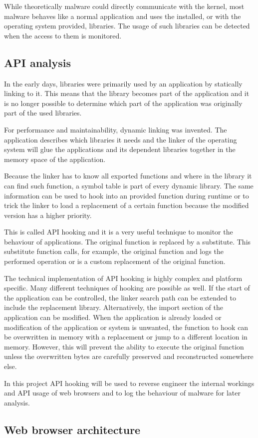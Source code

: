 While theoretically malware could directly communicate with the kernel, most malware behaves like a normal application and uses the installed, or with the operating system provided, libraries. The usage of such libraries can be detected when the access to them is monitored.

\subsection{API analysis}

In the early days, libraries were primarily used by an application by statically linking to it. This means that the library becomes part of the application and it is no longer possible to determine which part of the application was originally part of the used libraries.

For performance and maintainability, dynamic linking was invented. The application describes which libraries it needs and the linker of the operating system will glue the applications and its dependent libraries together in the memory space of the application. 

Because the linker has to know all exported functions and where in the library it can find such function, a symbol table is part of every dynamic library. The same information can be used to hook into an provided function during runtime or to trick the linker to load a replacement of a certain function because the modified version has a higher priority.

This is called API hooking\cite{} and it is a very useful technique to monitor the behaviour of applications. The original function is replaced by a substitute. This substitute function calls, for example, the original function and logs the performed operation or  is a custom replacement of the original function.

The technical implementation of API hooking is highly complex and platform specific. Many different techniques\cite{jbremer2012} of hooking are possible as well. If the start of the application can be controlled, the linker search path can be extended to include the replacement library. Alternatively, the import section of the application can be modified. When the application is already loaded or modification of the application or system is unwanted, the function to hook can be overwritten in memory with a replacement or jump to a different location in memory. However, this will prevent the ability to execute the original function unless the overwritten bytes are carefully preserved and reconstructed somewhere else.

In this project API hooking will be used to reverse engineer the internal workings and API usage of web browsers and to log the behaviour of malware for later analysis.

\subsection{Web browser architecture}

